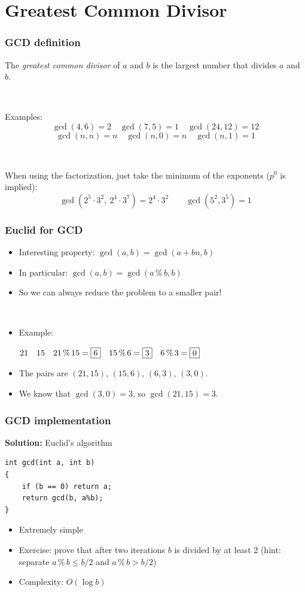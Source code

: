 \documentclass[12pt]{beamer}
\begin{document}
\section{Greatest Common Divisor}

\begin{frame}
\frametitle{GCD definition}
The \emph{greatest common divisor} of $a$ and $b$ is the largest number that divides $a$ and $b$.

~

Examples:
\[\gcd(4,6) = 2 \quad \gcd(7,5) = 1 \quad \gcd(24,12)=12\]
\[\gcd(n,n) = n \quad \gcd(n,0) = n \quad \gcd(n,1) = 1\]

~

When using the factorization, just take the minimum of the exponents ($p^0$ is implied):
\[\gcd(2^5\cdot3^2,\ 2^4\cdot3^7) = 2^4\cdot3^2 \qquad \gcd(5^2, 3^5) = 1\]
\end{frame}

\begin{frame}
\frametitle{Euclid for GCD}
\begin{itemize}
\item Interesting property: $\gcd(a,b) = \gcd(a+bn,b)$
\item In particular: $\gcd(a, b) = \gcd(a\,\%\,b, b)$
\item So we can always reduce the problem to a smaller pair!
\end{itemize}

~

\begin{itemize}
\item Example:
\begin{center}$21 \quad 15 \quad 21\,\%\,15=\fbox{6} \quad 15\,\%\,6=\fbox{3} \quad 6\,\%\,3=\fbox{0} $\end{center}
\item The pairs are $(21,15)$, $(15,6)$, $(6,3)$, $(3,0)$.
\item We know that $\gcd(3,0) = 3$, so $\gcd(21,15) = 3$.
\end{itemize}
\end{frame}

\begin{frame}[fragile]
\frametitle{GCD implementation}
\textbf{Solution:} Euclid's algorithm
\begin{lstlisting}
int gcd(int a, int b)
{
    if (b == 0) return a;
    return gcd(b, a%b);
}
\end{lstlisting}
\begin{itemize}
\item Extremely simple
\item Exercise: prove that after two iterations $b$ is divided by at least 2 (hint: separate $a\,\%\,b \leq b/2$ and $a\,\%\,b > b/2$)
\item Complexity: $O(\log b)$
\end{itemize}
\end{frame}
\end{document}
